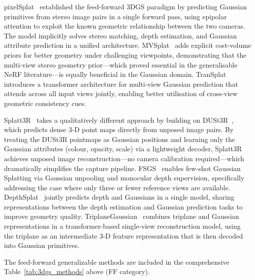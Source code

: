 pixelSplat~\citep{charatan2024pixelsplat} established the feed-forward 3DGS
paradigm by predicting Gaussian primitives from stereo image pairs in a single
forward pass, using epipolar attention to exploit the known geometric relationship
between the two cameras.
The model implicitly solves stereo matching, depth estimation, and Gaussian
attribute prediction in a unified architecture.
MVSplat~\citep{chen2024mvsplat} adds explicit cost-volume priors for better
geometry under challenging viewpoints, demonstrating that the multi-view stereo
geometry prior---which proved essential in the generalisable NeRF literature---is
equally beneficial in the Gaussian domain.
TranSplat~\citep{zhang2024transplate} introduces a transformer architecture for
multi-view Gaussian prediction that attends across all input views jointly,
enabling better utilisation of cross-view geometric consistency cues.

Splatt3R~\citep{smart2024splatt3r} takes a qualitatively different approach by
building on DUSt3R~\citep{wang2024dust3r}, which predicts dense 3-D point maps
directly from unposed image pairs.
By treating the DUSt3R pointmaps as Gaussian positions and learning only the
Gaussian attributes (colour, opacity, scale) via a lightweight decoder,
Splatt3R achieves unposed image reconstruction---no camera calibration
required---which dramatically simplifies the capture pipeline.
FSGS~\citep{zhu2024fsgs} enables few-shot Gaussian Splatting via Gaussian
unpooling and monocular depth supervision, specifically addressing the
case where only three or fewer reference views are available.
DepthSplat~\citep{xu2024depthsplat} jointly predicts depth and Gaussians
in a single model, sharing representations between the depth estimation
and Gaussian prediction tasks to improve geometry quality.
TriplaneGaussian~\citep{zou2024triplanegaussian} combines triplane and
Gaussian representations in a transformer-based single-view reconstruction model,
using the triplane as an intermediate 3-D feature representation that is
then decoded into Gaussian primitives.

The feed-forward generalizable methods are included in the comprehensive
Table~\ref{tab:3dgs_methods} above (FF category).

